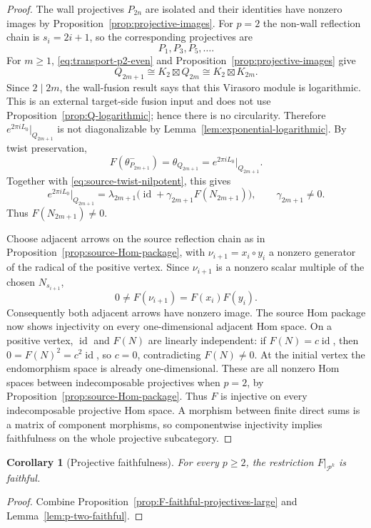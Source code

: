 \documentclass[12pt,leqno]{amsart}
\numberwithin{equation}{section}
\newtheorem{cor}[thm]{Corollary}
\newcommand{\id}{\operatorname{id}}
\newcommand{\boxt}{\boxtimes}
\begin{document}
\begin{proof}
The wall projectives $P_{2n}$ are isolated and their identities have
nonzero images by Proposition~\ref{prop:projective-images}.  For $p=2$ the non-wall reflection chain is $s_i=2i+1$, so the
corresponding projectives are
\[
 P_1,P_3,P_5,\ldots.
\]
For $m\ge1$, \eqref{eq:transport-p2-even} and
Proposition~\ref{prop:projective-images} give
\[
 Q_{2m+1}\cong K_2\boxt Q_{2m}\cong K_2\boxt K_{2m}.
\]
Since $2\mid2m$, the wall-fusion result
\cite[Theorem~6.5 and Remark~6.11]{McRaeSopin} says that this Virasoro
module is logarithmic.  This is an external target-side fusion input and
does not use Proposition~\ref{prop:Q-logarithmic}; hence there is no
circularity.  Therefore $e^{2\pi iL_0}|_{Q_{2m+1}}$ is not diagonalizable
by Lemma~\ref{lem:exponential-logarithmic}.  By twist preservation,
\[
 F(\theta^-_{P_{2m+1}})=\theta_{Q_{2m+1}}
 =e^{2\pi iL_0}|_{Q_{2m+1}}.
\]
Together with \eqref{eq:source-twist-nilpotent}, this gives
\[
 e^{2\pi iL_0}|_{Q_{2m+1}}
 =\lambda_{2m+1}
  \bigl(\id+\gamma_{2m+1}F(N_{2m+1})\bigr),
 \qquad \gamma_{2m+1}\ne0.
\]
Thus $F(N_{2m+1})\ne0$.

Choose adjacent arrows on the source reflection chain as in
Proposition~\ref{prop:source-Hom-package}, with
$\nu_{i+1}=x_i\circ y_i$ a nonzero generator of the radical of the positive
vertex.  Since $\nu_{i+1}$ is a nonzero scalar multiple of the chosen
$N_{s_{i+1}}$,
\[
 0\ne F(\nu_{i+1})=F(x_i)F(y_i).
\]
Consequently both adjacent arrows have nonzero image.  The source Hom
package now shows injectivity on every one-dimensional adjacent Hom space.
On a positive vertex, $\id$ and $F(N)$ are linearly independent: if
$F(N)=c\id$, then $0=F(N)^2=c^2\id$, so $c=0$, contradicting
$F(N)\ne0$.  At the initial vertex the endomorphism space is already
one-dimensional.  These are all nonzero Hom spaces between indecomposable projectives when
$p=2$, by Proposition~\ref{prop:source-Hom-package}.  Thus $F$ is injective on every indecomposable projective Hom space.  A
morphism between finite direct sums is a matrix of component morphisms, so
componentwise injectivity implies faithfulness on the whole projective
subcategory.
\end{proof}

\begin{cor}[Projective faithfulness]\label{cor:F-faithful-projectives}
For every $p\geq2$, the restriction $F|_{\mathcal P^k}$ is faithful.
\end{cor}

\begin{proof}
Combine Proposition~\ref{prop:F-faithful-projectives-large} and
Lemma~\ref{lem:p-two-faithful}.
\end{proof}
\end{document}
